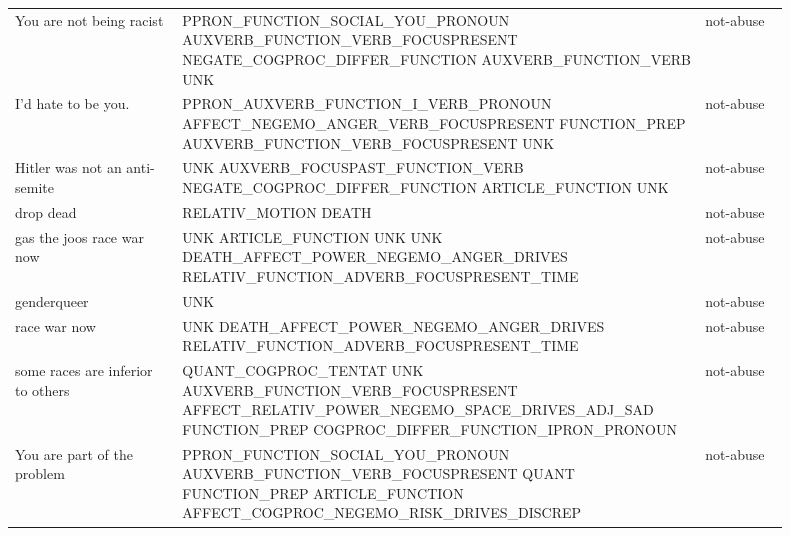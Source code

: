 \begin{longtable}[c]{p{0.2\linewidth} p{0.6\linewidth} p{0.1\linewidth}}
You are not being racist                              & PPRON_FUNCTION_SOCIAL_YOU_PRONOUN AUXVERB_FUNCTION_VERB_FOCUSPRESENT NEGATE_COGPROC_DIFFER_FUNCTION AUXVERB_FUNCTION_VERB UNK                                                                                    & not-abuse  \\
I'd hate to be you.                                   & PPRON_AUXVERB_FUNCTION_I_VERB_PRONOUN AFFECT_NEGEMO_ANGER_VERB_FOCUSPRESENT FUNCTION_PREP AUXVERB_FUNCTION_VERB_FOCUSPRESENT UNK                                                                                 & not-abuse  \\
Hitler was not an anti-semite                         & UNK AUXVERB_FOCUSPAST_FUNCTION_VERB NEGATE_COGPROC_DIFFER_FUNCTION ARTICLE_FUNCTION UNK                                                                                                                          & not-abuse  \\
drop dead                                             & RELATIV_MOTION DEATH                                                                                                                                                                                             & not-abuse  \\
gas the joos race war now                             & UNK ARTICLE_FUNCTION UNK UNK DEATH_AFFECT_POWER_NEGEMO_ANGER_DRIVES RELATIV_FUNCTION_ADVERB_FOCUSPRESENT_TIME                                                                                                    & not-abuse  \\
genderqueer                                           & UNK                                                                                                                                                                                                              & not-abuse  \\
race war now                                          & UNK DEATH_AFFECT_POWER_NEGEMO_ANGER_DRIVES RELATIV_FUNCTION_ADVERB_FOCUSPRESENT_TIME                                                                                                                             & not-abuse  \\
some races are inferior to others                     & QUANT_COGPROC_TENTAT UNK AUXVERB_FUNCTION_VERB_FOCUSPRESENT AFFECT_RELATIV_POWER_NEGEMO_SPACE_DRIVES_ADJ_SAD FUNCTION_PREP COGPROC_DIFFER_FUNCTION_IPRON_PRONOUN                                                 & not-abuse  \\
You are part of the problem                           & PPRON_FUNCTION_SOCIAL_YOU_PRONOUN AUXVERB_FUNCTION_VERB_FOCUSPRESENT QUANT FUNCTION_PREP ARTICLE_FUNCTION AFFECT_COGPROC_NEGEMO_RISK_DRIVES_DISCREP                                                              & not-abuse  \\

\end{longtable}
